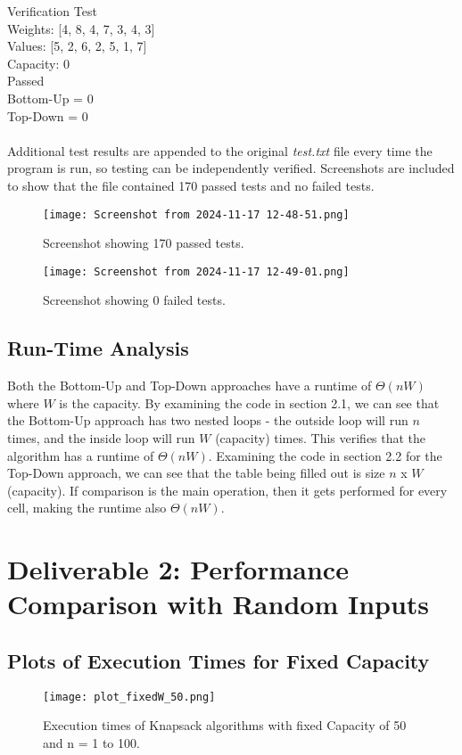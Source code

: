 \documentclass{article}
\begin{document}
Verification Test \\
Weights:  [4, 8, 4, 7, 3, 4, 3] \\
Values:  [5, 2, 6, 2, 5, 1, 7] \\
Capacity:  0 \\
Passed \\
Bottom-Up =  0 \\
Top-Down =  0 \\
\\
\rmfamily
Additional test results are appended to the original \textit{test.txt} file every time the program is run, so testing can be independently verified. Screenshots are included to show that the file contained 170 passed tests and no failed tests. 
    \begin{figure}[h!]
	\centering
	\texttt{[image: Screenshot from 2024-11-17 12-48-51.png]}
	\caption{Screenshot showing 170 passed tests.}
    \end{figure}
    
    \begin{figure}[h!]
	\centering
	\texttt{[image: Screenshot from 2024-11-17 12-49-01.png]}
	\caption{Screenshot showing 0 failed tests.}
    \end{figure}

\subsection{Run-Time Analysis}
Both the Bottom-Up and Top-Down approaches have a runtime of $\Theta(nW)$ where $W$ is the capacity. By examining the code in section 2.1, we can see that the Bottom-Up approach has two nested loops - the outside loop will run $n$ times, and the inside loop will run $W$ (capacity) times. This verifies that the algorithm has a runtime of $\Theta(nW)$. Examining the code in section 2.2 for the Top-Down approach, we can see that the table being filled out is size $n$ x $W$ (capacity). If comparison is the main operation, then it gets performed for every cell, making the runtime also $\Theta(nW)$.  

\newpage
\section{Deliverable 2: Performance Comparison with Random Inputs}
\subsection{Plots of Execution Times for Fixed Capacity}
\begin{figure}[h!]
    \centering
    \texttt{[image: plot\_fixedW\_50.png]}
    \caption{Execution times of Knapsack algorithms with fixed Capacity of 50 and n = 1 to 100.}
\end{figure}
\end{document}
